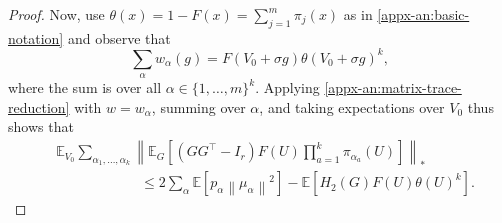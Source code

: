 \documentclass[11pt,letterpaper]{article}
\theoremstyle{remark}
\newcommand{\E}{\mathbb E}
\newcommand{\norm}[1]{\left\lVert#1\right\rVert}
\begin{document}
\begin{proof}
Now, use $\theta(x) = 1 - F(x) = \sum_{j=1}^m \pi_j(x)$ as in \eqref{appx-an:basic-notation} and observe that
\begin{equation}\label{appx-an:total-product-weight}
 \sum_\alpha w_\alpha(g)=F(V_0+\sigma g)\theta(V_0+\sigma g)^k,
\end{equation}
where the sum is over all $\alpha\in\{1,\dots,m\}^k$. Applying \eqref{appx-an:matrix-trace-reduction} with $w = w_{\alpha}$, summing over $\alpha$, and taking expectations over $V_0$ thus shows that
\begin{align}
& \E_{V_0}\sum_{\alpha_1,\ldots,\alpha_k}
 \left\|\E_G\left[(GG^\top-I_r)F(U)
              \prod_{a=1}^k\pi_{\alpha_a}(U)\right]\right\|_* \nonumber\\
& \qquad\qquad\qquad \le  2\sum_\alpha \E[p_\alpha\norm{\mu_\alpha}^2]
- \E[H_2(G)F(U)\theta(U)^k]. \label{appx-an:matrix-main-split}
\end{align}


\end{proof}
\end{document}
